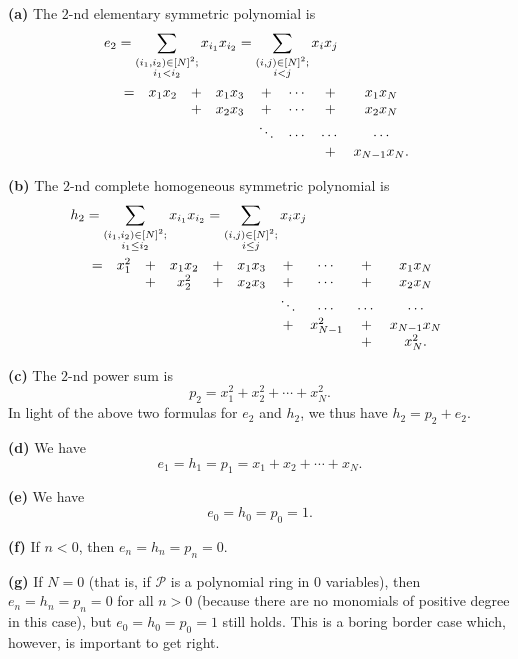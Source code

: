 \begin{example}
\label{exa.sf.ehp.1}\textbf{(a)} The $2$-nd elementary symmetric polynomial is%
\begin{align*}
e_{2}  &  =\sum_{\substack{\left(  i_{1},i_{2}\right)  \in\left[  N\right]
^{2};\\i_{1}<i_{2}}}x_{i_{1}}x_{i_{2}}=\sum_{\substack{\left(  i,j\right)
\in\left[  N\right]  ^{2};\\i<j}}x_{i}x_{j}\\
&
\begin{array}
[c]{cccccccc}%
= & x_{1}x_{2} & + & x_{1}x_{3} & + & \cdots & + & x_{1}x_{N}\\
&  & + & x_{2}x_{3} & + & \cdots & + & x_{2}x_{N}\\
&  &  &  & \ddots & \cdots & \cdots & \cdots\\
&  &  &  &  &  & + & x_{N-1}x_{N}.
\end{array}
\end{align*}


\textbf{(b)} The $2$-nd complete homogeneous symmetric polynomial is%
\begin{align*}
h_{2}  &  =\sum_{\substack{\left(  i_{1},i_{2}\right)  \in\left[  N\right]
^{2};\\i_{1}\leq i_{2}}}x_{i_{1}}x_{i_{2}}=\sum_{\substack{\left(  i,j\right)
\in\left[  N\right]  ^{2};\\i\leq j}}x_{i}x_{j}\\
&
\begin{array}
[c]{cccccccccc}%
= & x_{1}^{2} & + & x_{1}x_{2} & + & x_{1}x_{3} & + & \cdots & + & x_{1}%
x_{N}\\
&  & + & x_{2}^{2} & + & x_{2}x_{3} & + & \cdots & + & x_{2}x_{N}\\
&  &  &  &  &  & \ddots & \cdots & \cdots & \cdots\\
&  &  &  &  &  & + & x_{N-1}^{2} & + & x_{N-1}x_{N}\\
&  &  &  &  &  &  &  & + & x_{N}^{2}.
\end{array}
\end{align*}


\textbf{(c)} The $2$-nd power sum is%
\[
p_{2}=x_{1}^{2}+x_{2}^{2}+\cdots+x_{N}^{2}.
\]
In light of the above two formulas for $e_{2}$ and $h_{2}$, we thus have
$h_{2}=p_{2}+e_{2}$. \medskip

\textbf{(d)} We have%
\[
e_{1}=h_{1}=p_{1}=x_{1}+x_{2}+\cdots+x_{N}.
\]


\textbf{(e)} We have%
\[
e_{0}=h_{0}=p_{0}=1.
\]


\textbf{(f)} If $n<0$, then $e_{n}=h_{n}=p_{n}=0$. \medskip

\textbf{(g)} If $N=0$ (that is, if $\mathcal{P}$ is a polynomial ring in $0$
variables), then $e_{n}=h_{n}=p_{n}=0$ for all $n>0$ (because there are no
monomials of positive degree in this case), but $e_{0}=h_{0}=p_{0}=1$ still
holds. This is a boring border case which, however, is important to get right.
\end{example}

